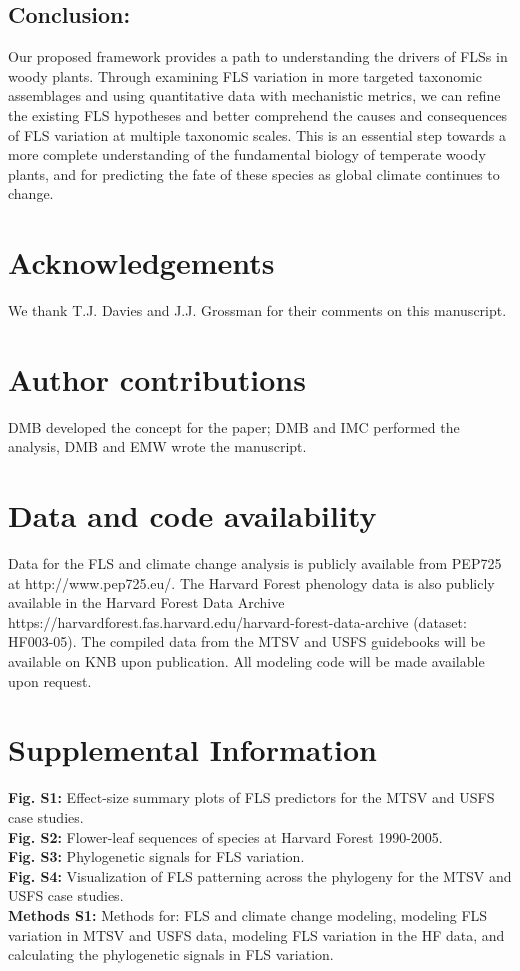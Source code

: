 \documentclass[12pt]{article}
\begin{document}
\subsection*{Conclusion:} 
\noindent Our proposed framework provides a path to understanding the drivers of FLSs in woody plants. Through examining FLS variation in more targeted taxonomic assemblages and using quantitative data with mechanistic metrics, we can refine the existing FLS hypotheses and better comprehend the causes and consequences of FLS variation at multiple taxonomic scales. This is an essential step towards a more complete understanding of the fundamental biology of temperate woody plants, and for predicting the fate of these species as global climate continues to change.

\section*{Acknowledgements}
\noindent We thank T.J. Davies and J.J. Grossman for their comments on this manuscript.

\section*{Author contributions}
DMB developed the concept for the paper; DMB and IMC performed the analysis, DMB and EMW wrote the manuscript.

\section*{Data and code availability}
Data for the FLS and climate change analysis is publicly available from PEP725 at http://www.pep725.eu/. The Harvard Forest phenology data is also publicly available in the Harvard Forest Data Archive https://harvardforest.fas.harvard.edu/harvard-forest-data-archive (dataset: HF003-05). The compiled data from the MTSV and USFS guidebooks will be available on KNB upon publication. All modeling code will be made available upon request. %




\newpage
\section*{Supplemental Information}
\textbf{Fig. S1:} Effect-size summary plots of FLS predictors for the MTSV and USFS case studies. \\
\textbf{Fig. S2:} Flower-leaf sequences of species at Harvard Forest 1990-2005.\\
\textbf{Fig. S3:} Phylogenetic signals for FLS variation.\\
\textbf{Fig. S4:} Visualization of FLS patterning across the phylogeny for the MTSV and USFS case studies.\\
\textbf{Methods S1:} Methods for: FLS and climate change modeling, modeling FLS variation in MTSV and USFS data, modeling FLS variation in the HF data, and calculating the phylogenetic signals in FLS variation.
\newpage
\end{document}
